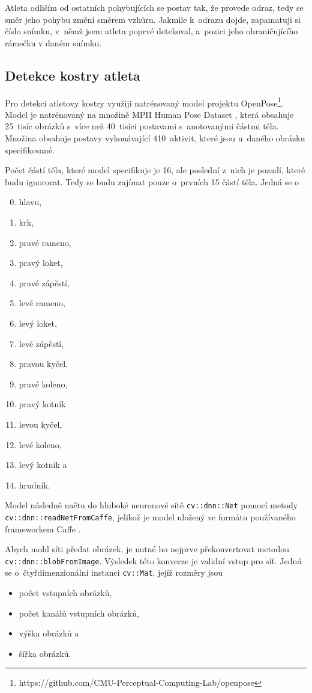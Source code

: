 Atleta odliším od ostatních pohybujících se postav tak, že provede odraz, tedy se směr jeho pohybu změní směrem vzhůru. Jakmile k~odrazu dojde, zapamatuji si číslo snímku, v~němž jsem atleta poprvé detekoval, a~pozici jeho ohraničujícího rámečku v daném snímku.

\subsection{Detekce kostry atleta}

Pro detekci atletovy kostry využiji natrénovaný model projektu OpenPose\footnote{https://github.com/CMU-Perceptual-Computing-Lab/openpose}. Model je natrénovaný na množině MPII Human Pose Dataset \citep{MPIIHPE}, která obsahuje 25~tisíc obrázků s~více než 40~tisíci postavami s~anotovanými částmi těla. Množina obsahuje postavy vykonávající 410~aktivit, které jsou u~daného obrázku specifikované.

Počet částí těla, které model specifikuje je 16, ale poslední z~nich je pozadí, které budu ignorovat. Tedy se budu zajímat pouze o~prvních 15 částí těla. Jedná se o
\begin{enumerate}
\setcounter{enumi}{-1}
\item hlavu,
\item krk,
\item pravé rameno,
\item pravý loket,
\item pravé zápěstí,
\item levé rameno,
\item levý loket,
\item levé zápěstí,
\item pravou kyčel,
\item pravé koleno,
\item pravý kotník
\item levou kyčel,
\item levé koleno,
\item levý kotník a
\item hrudník.
\end{enumerate}

Model následně načtu do hluboké neuronové sítě \texttt{cv::dnn::Net} pomocí metody \texttt{cv::dnn::readNetFromCaffe}, jelikož je model uložený ve formátu používaného frameworkem Caffe \citep{Caffe}.

Abych mohl síti předat obrázek, je nutné ho nejprve překonvertovat metodou \texttt{cv::dnn::blobFromImage}. Výsledek této konverze je validní vstup pro síť. Jedná se o~čtyřdimenzionální instanci \texttt{cv::Mat}, jejíž rozměry jsou
\begin{itemize}
\item počet vstupních obrázků,
\item počet kanálů vstupních obrázků,
\item výška obrázků a
\item šířka obrázků.
\end{itemize}

